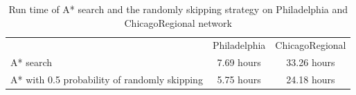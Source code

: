\begin{table}[H]
    \begin{tabular}{p{} | c c}
        & Philadelphia & ChicagoRegional \\ \cmidrule(lr){2-2} \cmidrule(lr){3-3}
        A* search & 7.69 hours & 33.26 hours \\ 
        A* with 0.5 probability of randomly skipping & 5.75 hours & 24.18 hours\\
    \end{tabular}
    \caption{Run time of A* search and the randomly skipping strategy on Philadelphia and ChicagoRegional network}
    \label{table:runtime_large_network}
\end{table}
